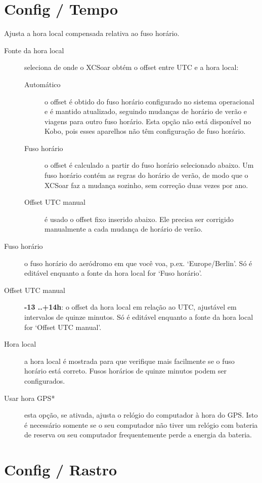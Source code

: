 \section{Config / Tempo}

Ajusta a hora local compensada relativa ao fuso horário.

\begin{description}
\item[Fonte da hora local]  seleciona de onde o XCSoar obtém o offset entre UTC e a
  hora local:
  \begin{description}
  \item[Automático]  o offset é obtido do fuso horário configurado no sistema
    operacional e é mantido atualizado, seguindo mudanças de horário de verão e
    viagens para outro fuso horário.  Esta opção não está disponível no Kobo, pois
    esses aparelhos não têm configuração de fuso horário.
  \item[Fuso horário]  o offset é calculado a partir do fuso horário selecionado
    abaixo.  Um fuso horário contém as regras do horário de verão, de modo que o
    XCSoar faz a mudança sozinho, sem correção duas vezes por ano.
  \item[Offset UTC manual]  é usado o offset fixo inserido abaixo.  Ele precisa ser
    corrigido manualmente a cada mudança de horário de verão.
  \end{description}
\item[Fuso horário]  o fuso horário do aeródromo em que você voa, p.ex.
  `Europe/Berlin'.  Só é editável enquanto a fonte da hora local for `Fuso horário'.
\item[Offset UTC manual]  {\bf -13 ..+14h}: o offset da hora local em relação ao
  UTC, ajustável em intervalos de quinze minutos.  Só é editável enquanto a fonte
  da hora local for `Offset UTC manual'.
\item[Hora local]  a hora local é mostrada para que verifique mais facilmente se o fuso horário está correto.  Fusos horários de quinze minutos podem ser configurados.
\item[Usar hora GPS*] esta opção, se ativada, ajusta o relógio do computador à hora do GPS.  Isto é necessário somente se o seu computador não tiver um relógio com bateria de reserva ou seu computador frequentemente perde a energia da bateria.
\end{description}


\section{Config / Rastro}

